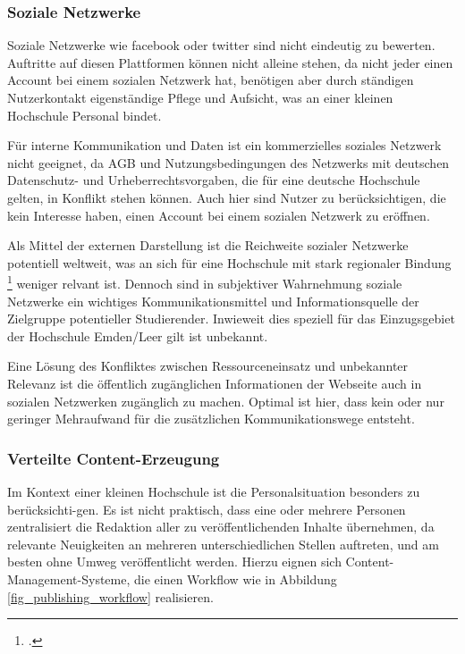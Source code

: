 \subsubsection{Soziale Netzwerke}
Soziale Netzwerke wie facebook oder twitter sind nicht eindeutig zu bewerten. Auftritte auf diesen Plattformen können nicht alleine stehen, da nicht jeder einen Account bei einem sozialen Netzwerk hat, benötigen aber durch ständigen Nutzerkontakt eigenständige Pflege und Aufsicht, was an einer kleinen Hochschule Personal bindet.

Für interne Kommunikation und Daten ist ein kommerzielles soziales Netzwerk nicht geeignet, da AGB und Nutzungsbedingungen des Netzwerks mit deutschen Datenschutz- und Urheberrechtsvorgaben, die für eine deutsche Hochschule gelten, in Konflikt stehen können. Auch hier sind Nutzer zu berücksichtigen, die kein Interesse haben, einen Account bei einem sozialen Netzwerk zu eröffnen.

Als Mittel der externen Darstellung ist die Reichweite sozialer Netzwerke potentiell weltweit, was an sich für eine Hochschule mit stark regionaler Bindung \footcite[Vgl.][]{hsel_leitbild_url} weniger relvant ist. Dennoch sind in subjektiver Wahrnehmung soziale Netzwerke ein wichtiges Kommunikationsmittel und Informationsquelle der Zielgruppe potentieller Studierender. Inwieweit dies speziell für das Einzugsgebiet der Hochschule Emden/Leer gilt ist unbekannt.

Eine Lösung des Konfliktes zwischen Ressourceneinsatz und unbekannter Relevanz ist die öffentlich zugänglichen Informationen der Webseite auch in sozialen Netzwerken zugänglich zu machen. Optimal ist hier, dass kein oder nur geringer Mehraufwand für die zusätzlichen Kommunikationswege entsteht.

\subsubsection{Verteilte Content-Erzeugung}
Im Kontext einer kleinen Hochschule ist die Personalsituation besonders zu berücksichti-gen. Es ist nicht praktisch, dass eine oder mehrere Personen zentralisiert die Redaktion aller zu veröffentlichenden Inhalte übernehmen, da relevante Neuigkeiten an mehreren unterschiedlichen Stellen auftreten, und am besten ohne Umweg veröffentlicht werden. Hierzu eignen sich Content-Management-Systeme, die einen Workflow wie in Abbildung \ref{fig_publishing_workflow} realisieren.

